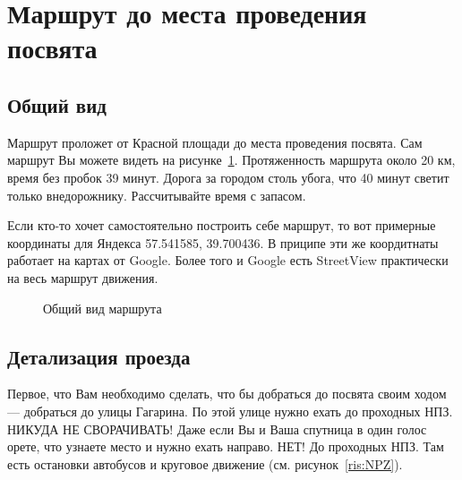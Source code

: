 \documentclass[a4paper, 12pt]{extarticle}
\begin{document}
\section*{Маршрут до места проведения посвята}
\subsection*{Общий вид}
\par Маршрут проложет от Красной площади до места проведения посвята. Сам маршрут Вы можете видеть на рисунке~\ref{ris:generalRoute}. Протяженность маршрута около 20 км, время без пробок 39 минут. Дорога за городом столь убога, что 40 минут светит только внедорожнику. Рассчитывайте время с запасом.

\par Если кто-то хочет самостоятельно построить себе маршрут, то вот примерные координаты для Яндекса 57.541585, 39.700436. В приципе эти же коордитнаты работает на картах от Google. Более того и Google есть StreetView практически на весь маршрут движения.
\begin{figure}[h]
	\caption{Общий вид маршрута}
	\label{ris:generalRoute}
\end{figure}

\newpage
\subsection*{Детализация проезда}
\par Первое, что Вам необходимо сделать, что бы добраться до посвята своим ходом --- добраться до улицы Гагарина. По этой улице нужно ехать до проходных НПЗ. НИКУДА НЕ СВОРАЧИВАТЬ! Даже если Вы и Ваша спутница в один голос орете, что узнаете место и нужно ехать направо. НЕТ! До проходных НПЗ. Там есть остановки автобусов и круговое движение (см. рисунок~\ref{ris:NPZ}).
\end{document}
